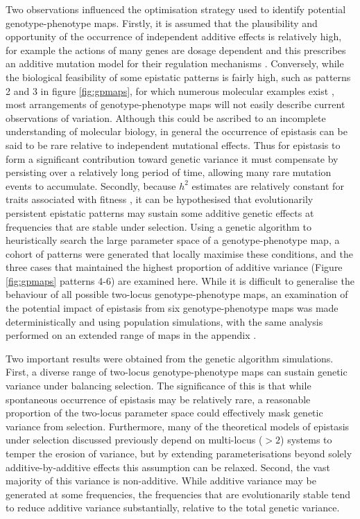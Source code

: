 Two observations influenced the optimisation strategy used to identify potential genotype-phenotype maps. Firstly, it is assumed that the plausibility and opportunity of the occurrence of independent additive effects is relatively high, for example the actions of many genes are dosage dependent and this prescribes an additive mutation model for their regulation mechanisms \citep{Hedrich2001}. Conversely, while the biological feasibility of some epistatic patterns is fairly high, such as patterns 2 and 3 in figure \ref{fig:gpmaps}, for which numerous molecular examples exist \citep{Nowak1997,Kafri2009,Li2010}, most arrangements of genotype-phenotype maps will not easily describe current observations of variation. Although this could be ascribed to an incomplete understanding of molecular biology, in general the occurrence of epistasis can be said to be rare relative to independent mutational effects. Thus for epistasis to form a significant contribution toward genetic variance it must compensate by persisting over a relatively long period of time, allowing many rare mutation events to accumulate. Secondly, because $h^2$ estimates are relatively constant for traits associated with fitness \citep{Mousseau1987,Bradshaw1991}, it can be hypothesised that evolutionarily persistent epistatic patterns may sustain some additive genetic effects at frequencies that are stable under selection. Using a genetic algorithm to heuristically search the large parameter space of a genotype-phenotype map, a cohort of patterns were generated that locally maximise these conditions, and the three cases that maintained the highest proportion of additive variance (Figure \ref{fig:gpmaps} patterns 4-6) are examined here. While it is difficult to generalise the behaviour of all possible two-locus genotype-phenotype maps, an examination of the potential impact of epistasis from six genotype-phenotype maps was made deterministically and using population simulations, with the same analysis performed on an extended range of maps in the appendix \citep{Li2000}.

Two important results were obtained from the genetic algorithm simulations. First, a diverse range of two-locus genotype-phenotype maps can sustain genetic variance under balancing selection. The significance of this is that while spontaneous occurrence of epistasis may be relatively rare, a reasonable proportion of the two-locus parameter space could effectively mask genetic variance from selection. Furthermore, many of the theoretical models of epistasis under selection discussed previously depend on multi-locus ($>2$) systems to temper the erosion of variance, but by extending parameterisations beyond solely additive-by-additive effects this assumption can be relaxed. Second, the vast majority of this variance is non-additive. While additive variance may be generated at some frequencies, the frequencies that are evolutionarily stable tend to reduce additive variance substantially, relative to the total genetic variance.


